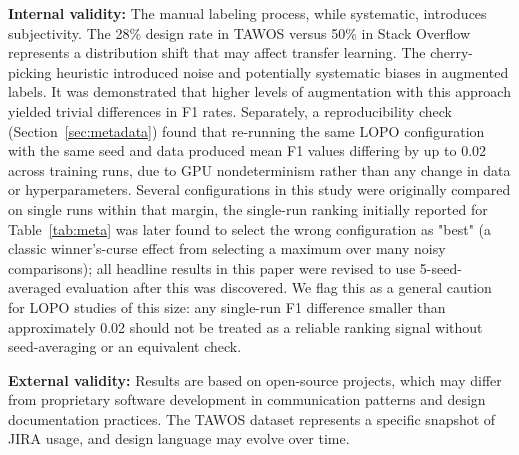 \documentclass[preprint,12pt]{elsarticle}
\begin{document}
\textbf{Internal validity:} The manual labeling process, while systematic, introduces subjectivity. The 28\% design rate in TAWOS versus 50\% in Stack Overflow represents a distribution shift that may affect transfer learning. The cherry-picking heuristic introduced noise and potentially systematic biases in augmented labels. It was demonstrated that higher levels of augmentation with this approach yielded trivial differences in F1 rates. Separately, a reproducibility check (Section~\ref{sec:metadata}) found that re-running the same LOPO configuration with the same seed and data produced mean F1 values differing by up to 0.02 across training runs, due to GPU nondeterminism rather than any change in data or hyperparameters. Several configurations in this study were originally compared on single runs within that margin, the single-run ranking initially reported for Table~\ref{tab:meta} was later found to select the wrong configuration as "best" (a classic winner's-curse effect from selecting a maximum over many noisy comparisons); all headline results in this paper were revised to use 5-seed-averaged evaluation after this was discovered. We flag this as a general caution for LOPO studies of this size: any single-run F1 difference smaller than approximately 0.02 should not be treated as a reliable ranking signal without seed-averaging or an equivalent check.

\textbf{External validity:} Results are based on open-source projects, which may differ from proprietary software development in communication patterns and design documentation practices. The TAWOS dataset represents a specific snapshot of JIRA usage, and design language may evolve over time.
\end{document}
